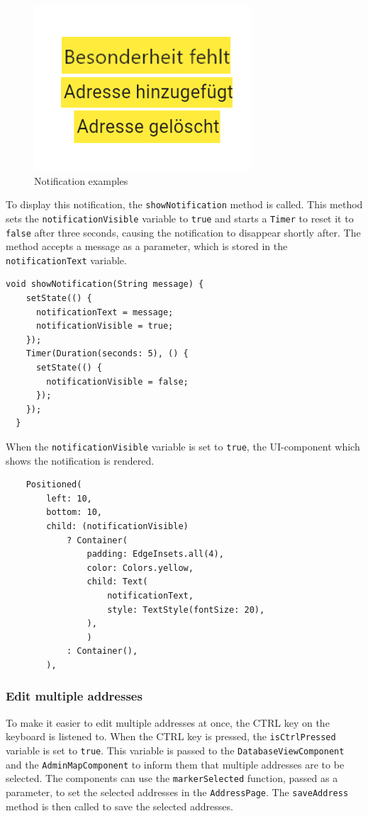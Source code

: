 \begin{figure}[H]
    \centering
    \includegraphics[width=0.4\linewidth]{images/AdminPanel/NotificationExamples.png}
    \caption{Notification examples}
\end{figure}

To display this notification, the \texttt{showNotification} method is called. This method sets the \texttt{notificationVisible} variable to \texttt{true} and starts a \texttt{Timer} to reset it to \texttt{false} after three seconds, causing the notification to disappear shortly after. The method accepts a message as a parameter, which is stored in the \texttt{notificationText} variable.
\lstset{style=mycsharp, caption=showNotification method}
\begin{lstlisting}
void showNotification(String message) {
    setState(() {
      notificationText = message;
      notificationVisible = true;
    }); 
    Timer(Duration(seconds: 5), () {
      setState(() {
        notificationVisible = false;
      });
    });
  }
\end{lstlisting}

When the \texttt{notificationVisible} variable is set to \texttt{true}, the UI-component which shows the notification is rendered.
\lstset{style=mycsharp, caption=Notification in AddressPage}
\begin{lstlisting}
    Positioned(
        left: 10,
        bottom: 10,
        child: (notificationVisible)
            ? Container(
                padding: EdgeInsets.all(4),
                color: Colors.yellow,
                child: Text(
                    notificationText,
                    style: TextStyle(fontSize: 20),
                ),
                )
            : Container(),
        ),
\end{lstlisting}

\subsubsection{Edit multiple addresses}
\label{fig:Edit multiple addresses}
To make it easier to edit multiple addresses at once, the CTRL key on the keyboard is listened to. When the CTRL key is pressed, the \texttt{isCtrlPressed} variable is set to \texttt{true}. This variable is passed to the \texttt{DatabaseViewComponent} and the \texttt{AdminMapComponent} to inform them that multiple addresses are to be selected. The components can use the \texttt{markerSelected} function, passed as a parameter, to set the selected addresses in the \texttt{AddressPage}. The \texttt{saveAddress} method is then called to save the selected addresses.\\


